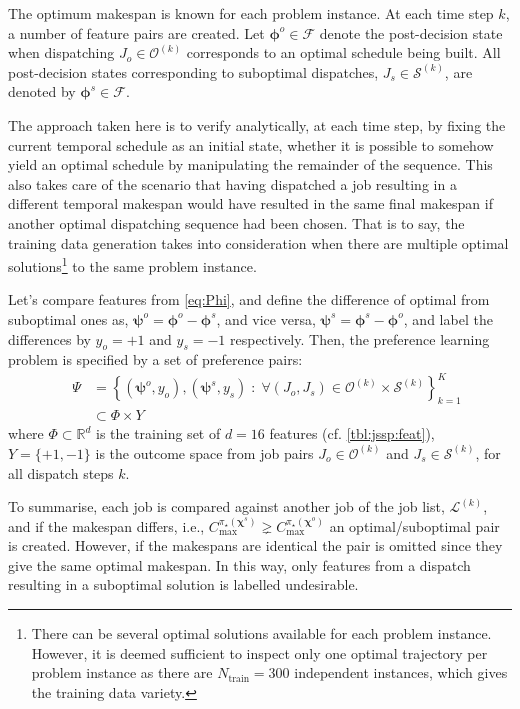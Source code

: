 \documentclass[twocolumn]{svjour3}
\newcommand{\vphi}{\bm{\phi}}
\newcommand{\vchi}{\bm \chi}
\newcommand{\vpsi}{\bm \psi}
\newcommand{\NrFeatLocal}{16}
\begin{document}
The optimum makespan is known for each problem instance. At each time step $k$, 
a number of feature pairs are created. 
Let $\vphi^{o}\in\mathcal{F}$ denote the post-decision state when dispatching 
$J_o\in\mathcal{O}^{(k)}$ corresponds to an optimal schedule being built. 
All post-decision states corresponding to suboptimal dispatches, 
$J_s\in\mathcal{S}^{(k)}$, are denoted by $\vphi^{s}\in\mathcal{F}$.

The approach taken here is to verify analytically, at each time step, by fixing 
the current temporal schedule as an initial state, whether it is possible to 
somehow yield an optimal schedule by manipulating the remainder of the 
sequence. This also takes care of the scenario that having dispatched a job 
resulting in a different temporal makespan would have resulted in the same 
final makespan if another optimal dispatching sequence had been chosen. 
That is to say, the training data generation takes into consideration when 
there are multiple optimal solutions\footnote{
There can be several optimal solutions available for each problem instance. 
However, it is deemed sufficient to inspect only one optimal trajectory per 
problem instance as there are $N_{\text{train}}=300$ independent instances, 
which gives the training data variety.} 
to the same problem instance. 

Let's compare features from \cref{eq:Phi}, and define the difference of optimal 
from suboptimal ones as, 
\mbox{$\vpsi^{o}=\vphi^{o}-\vphi^{s}$}, and vice versa, 
\mbox{$\vpsi^{s}=\vphi^{s}-\vphi^{o}$}, and label the differences by $y_o=+1$ 
and $y_s=-1$ respectively. 
Then, the preference learning problem is specified by a set of preference pairs:
\begin{equation}
\begin{split}
\quad \Psi & = \left\{\left(\vpsi^o,y_o\right),\left(\vpsi^s,y_s\right)
\;:\; 
\forall \left(J_o,J_s\right) \in \mathcal{O}^{(k)} \times 
\mathcal{S}^{(k)}\right\}_{k=1}^{K} \\
& \subset  \Phi\times Y
\end{split} \label{eq:prefset}
\end{equation}
where $\Phi\subset \mathbb{R}^d$ is the training set of $d=\NrFeatLocal$ 
features (cf. \cref{tbl:jssp:feat}), $Y=\{+1,-1\}$ is the outcome space from 
job pairs $J_o\in\mathcal{O}^{(k)}$ and $J_s\in\mathcal{S}^{(k)}$, for all 
dispatch steps $k$.

To summarise, each job is compared against another job of the job list, 
$\mathcal{L}^{(k)}$, and if the makespan differs, i.e., 
$C_{\max}^{\pi_\star(\vchi^s)} \gneq C_{\max}^{\pi_\star(\vchi^o)}$ an 
optimal/suboptimal pair is created. 
However, if the makespans are identical the pair is omitted since they give the 
same optimal makespan. 
In this way, only features from a dispatch resulting in a suboptimal solution 
is labelled undesirable.
\end{document}
